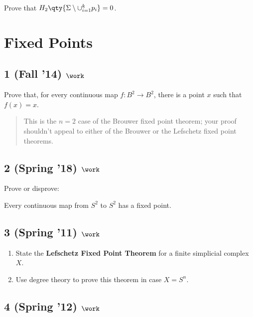 Prove that \(H_2 \qty{\Sigma \setminus \cup_{i=1}^k {p_i} } = 0\).

\hypertarget{fixed-points}{%
\section{Fixed Points}\label{fixed-points}}

\hypertarget{fall-14-work-5}{%
\subsection{\texorpdfstring{1 (Fall '14)
\(\work\)}{1 (Fall '14) \textbackslash work}}\label{fall-14-work-5}}

Prove that, for every continuous map \(f : B^2 \to B^2\), there is a
point \(x\) such that \(f (x) = x\).

\begin{quote}
This is the \(n = 2\) case of the Brouwer fixed point theorem; your
proof shouldn't appeal to either of the Brouwer or the Lefschetz fixed
point theorems.
\end{quote}

\hypertarget{spring-18-work-3}{%
\subsection{\texorpdfstring{2 (Spring '18)
\(\work\)}{2 (Spring '18) \textbackslash work}}\label{spring-18-work-3}}

Prove or disprove:

Every continuous map from \(S^2\) to \(S^2\) has a fixed point.

\hypertarget{spring-11-work-3}{%
\subsection{\texorpdfstring{3 (Spring '11)
\(\work\)}{3 (Spring '11) \textbackslash work}}\label{spring-11-work-3}}

\begin{enumerate}
\def\labelenumi{\alph{enumi}.}
\item
  State the \textbf{Lefschetz Fixed Point Theorem} for a finite
  simplicial complex \(X\).
\item
  Use degree theory to prove this theorem in case \(X = S^n\).
\end{enumerate}

\hypertarget{spring-12-work-2}{%
\subsection{\texorpdfstring{4 (Spring '12)
\(\work\)}{4 (Spring '12) \textbackslash work}}\label{spring-12-work-2}}


